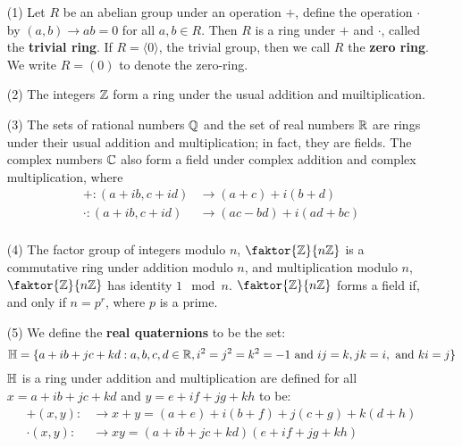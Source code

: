 \begin{example}\label{example_5.1}
  \begin{enumerate}
    \item[(1)] Let $R$ be an abelian group under an operation $+$, define the operation
      $\cdot$ by  $(a,b) \xrightarrow{} ab=0$ for all $a,b \in R$. Then $R$ is a
      ring under $+$ and  $\cdot$, called the  \textbf{trivial ring}. If
      $R=\langle 0 \rangle$, the trivial group, then we call $R$ the  \textbf{zero
      ring}. We write $R=(0)$ to denote the zero-ring.

    \item[(2)] The integers $\mathbb{Z}$ form a ring under the usual addition and
      muiltiplication.

    \item[(3)] The sets of rational numbers $\mathbb{Q}$ and the set of real numbers
      $\mathbb{R}$ are rings under their usual addition and multiplication; in fact,
      they are fields. The complex numbers $\mathbb{C}$ also form a field under
      complex addition and complex multiplication, where
      \begin{align*}
        +:(a+ib,c+id)   &   \xrightarrow{} (a+c)+i(b+d)   \\
        \cdot:(a+ib,c+id)   &   \xrightarrow{} (ac-bd)+i(ad+bc)   \\
      \end{align*}

    \item[(4)] The factor group of integers modulo $n$, $\faktor{\Z}{n\Z}$ is a
      commutative ring under addition modulo $n$, and multiplication modulo
      $n$, $\faktor{\Z}{n\Z}$ has identity $1 \mod{n}$. $\faktor{\Z}{n\Z}$
      forms a field if, and only if $n=p^r$, where $p$ is a prime.

    \item[(5)] We define the \textbf{real quaternions} to be the set:
      \begin{equation*}
        \mathbb{H}=\{a+ib+jc+kd : a,b,c,d \in \mathbb{R}, i^2=j^2=k^2=-1 \text{ and }
        ij=k, jk=i, \text{ and } ki=j\}
      \end{equation*}
      $\mathbb{H}$ is a ring under addition and
      multiplication are defined for all $x=a+ib+jc+kd$ and $y=e+if+jg+kh$ to be:
      \begin{align*}
        +(x,y): &   \xrightarrow{} x+y=(a+e)+i(b+f)+j(c+g)+k(d+h)   \\
        \cdot(x,y):  &   \xrightarrow{} xy= (a+ib+jc+kd)(e+if+jg+kh) \\
      \end{align*}


\end{enumerate}
\end{example}
